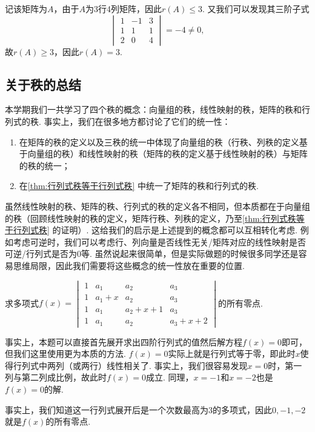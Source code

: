 \begin{solution}
    记该矩阵为$A$，由于$A$为3行4列矩阵，因此$r(A)\leqslant 3$. 又我们可以发现其三阶子式
    \[\begin{vmatrix}
            1 & -1 & 3 \\ 1 & 1 & 1 \\ 2 & 0 & 4
        \end{vmatrix}=-4\neq 0,\]
    故$r(A)\geqslant 3$，因此$r(A)=3$.
\end{solution}

\subsection{关于秩的总结}

本学期我们一共学习了四个秩的概念：向量组的秩，线性映射的秩，矩阵的秩和行列式的秩. 事实上，我们在很多地方都讨论了它们的统一性：
\begin{enumerate}
    \item 在矩阵的秩的定义以及三秩的统一中体现了向量组的秩（行秩、列秩的定义基于向量组的秩）和线性映射的秩（矩阵的秩的定义基于线性映射的秩）与矩阵的秩的统一；

    \item 在\autoref{thm:行列式秩等于行列式秩} 中统一了矩阵的秩和行列式的秩.
\end{enumerate}
虽然线性映射的秩、矩阵的秩、行列式的秩的定义各不相同，但本质都在于向量组的秩（回顾线性映射的秩的定义，矩阵行秩、列秩的定义，乃至\autoref*{thm:行列式秩等于行列式秩} 的证明）. 这给我们的启示是上述提到的概念都可以互相转化考虑. 例如考虑可逆时，我们可以考虑行、列向量是否线性无关/矩阵对应的线性映射是否可逆/行列式是否为0等. 虽然说起来很简单，但是实际做题的时候很多同学还是容易思维局限，因此我们需要将这些概念的统一性放在重要的位置.
\begin{example}{}{}
    求多项式$f(x)=\begin{vmatrix}
            1 & a_1   & a_2     & a_3     \\
            1 & a_1+x & a_2     & a_3     \\
            1 & a_1   & a_2+x+1 & a_3     \\
            1 & a_1   & a_2     & a_3+x+2
        \end{vmatrix}$的所有零点.
\end{example}

\begin{solution}
    事实上，本题可以直接首先展开求出四阶行列式的值然后解方程$f(x)=0$即可，但我们这里使用更为本质的方法. $f(x)=0$实际上就是行列式等于零，即此时$x$使得行列式中两列（或两行）线性相关了. 事实上，我们很容易发现$x=0$时，第一列与第二列成比例，故此时$f(x)=0$成立. 同理，$x=-1$和$x=-2$也是$f(x)=0$的解.

    事实上，我们知道这一行列式展开后是一个次数最高为3的多项式，因此$0,-1,-2$就是$f(x)$的所有零点.
\end{solution}


